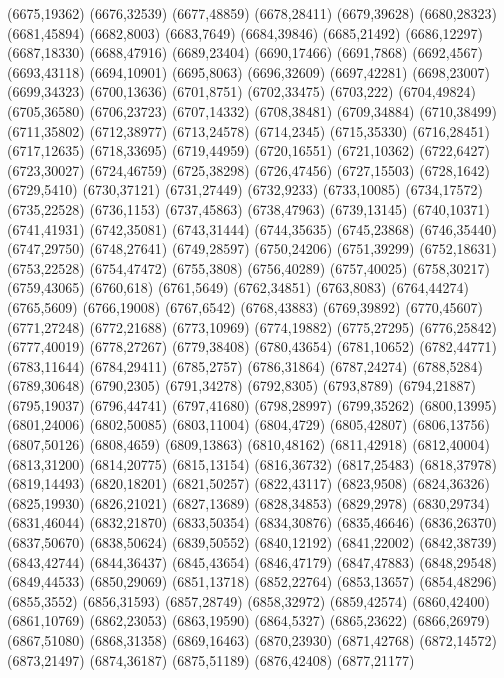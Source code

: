 (6675,19362)
(6676,32539)
(6677,48859)
(6678,28411)
(6679,39628)
(6680,28323)
(6681,45894)
(6682,8003)
(6683,7649)
(6684,39846)
(6685,21492)
(6686,12297)
(6687,18330)
(6688,47916)
(6689,23404)
(6690,17466)
(6691,7868)
(6692,4567)
(6693,43118)
(6694,10901)
(6695,8063)
(6696,32609)
(6697,42281)
(6698,23007)
(6699,34323)
(6700,13636)
(6701,8751)
(6702,33475)
(6703,222)
(6704,49824)
(6705,36580)
(6706,23723)
(6707,14332)
(6708,38481)
(6709,34884)
(6710,38499)
(6711,35802)
(6712,38977)
(6713,24578)
(6714,2345)
(6715,35330)
(6716,28451)
(6717,12635)
(6718,33695)
(6719,44959)
(6720,16551)
(6721,10362)
(6722,6427)
(6723,30027)
(6724,46759)
(6725,38298)
(6726,47456)
(6727,15503)
(6728,1642)
(6729,5410)
(6730,37121)
(6731,27449)
(6732,9233)
(6733,10085)
(6734,17572)
(6735,22528)
(6736,1153)
(6737,45863)
(6738,47963)
(6739,13145)
(6740,10371)
(6741,41931)
(6742,35081)
(6743,31444)
(6744,35635)
(6745,23868)
(6746,35440)
(6747,29750)
(6748,27641)
(6749,28597)
(6750,24206)
(6751,39299)
(6752,18631)
(6753,22528)
(6754,47472)
(6755,3808)
(6756,40289)
(6757,40025)
(6758,30217)
(6759,43065)
(6760,618)
(6761,5649)
(6762,34851)
(6763,8083)
(6764,44274)
(6765,5609)
(6766,19008)
(6767,6542)
(6768,43883)
(6769,39892)
(6770,45607)
(6771,27248)
(6772,21688)
(6773,10969)
(6774,19882)
(6775,27295)
(6776,25842)
(6777,40019)
(6778,27267)
(6779,38408)
(6780,43654)
(6781,10652)
(6782,44771)
(6783,11644)
(6784,29411)
(6785,2757)
(6786,31864)
(6787,24274)
(6788,5284)
(6789,30648)
(6790,2305)
(6791,34278)
(6792,8305)
(6793,8789)
(6794,21887)
(6795,19037)
(6796,44741)
(6797,41680)
(6798,28997)
(6799,35262)
(6800,13995)
(6801,24006)
(6802,50085)
(6803,11004)
(6804,4729)
(6805,42807)
(6806,13756)
(6807,50126)
(6808,4659)
(6809,13863)
(6810,48162)
(6811,42918)
(6812,40004)
(6813,31200)
(6814,20775)
(6815,13154)
(6816,36732)
(6817,25483)
(6818,37978)
(6819,14493)
(6820,18201)
(6821,50257)
(6822,43117)
(6823,9508)
(6824,36326)
(6825,19930)
(6826,21021)
(6827,13689)
(6828,34853)
(6829,2978)
(6830,29734)
(6831,46044)
(6832,21870)
(6833,50354)
(6834,30876)
(6835,46646)
(6836,26370)
(6837,50670)
(6838,50624)
(6839,50552)
(6840,12192)
(6841,22002)
(6842,38739)
(6843,42744)
(6844,36437)
(6845,43654)
(6846,47179)
(6847,47883)
(6848,29548)
(6849,44533)
(6850,29069)
(6851,13718)
(6852,22764)
(6853,13657)
(6854,48296)
(6855,3552)
(6856,31593)
(6857,28749)
(6858,32972)
(6859,42574)
(6860,42400)
(6861,10769)
(6862,23053)
(6863,19590)
(6864,5327)
(6865,23622)
(6866,26979)
(6867,51080)
(6868,31358)
(6869,16463)
(6870,23930)
(6871,42768)
(6872,14572)
(6873,21497)
(6874,36187)
(6875,51189)
(6876,42408)
(6877,21177)
